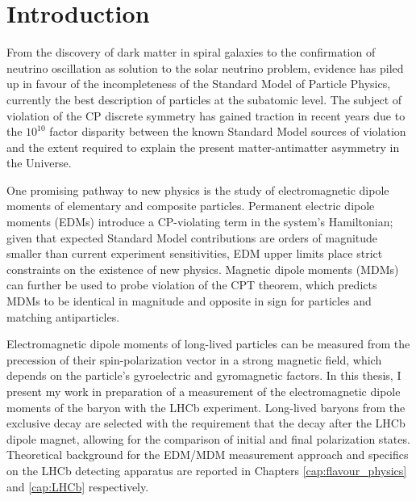 \chapter*{Introduction}

%

From the discovery of dark matter in spiral galaxies to the confirmation of neutrino oscillation as solution to the solar neutrino problem, evidence has piled up in favour of the incompleteness of the Standard Model of Particle Physics, currently the best description of particles at the subatomic level.
The subject of violation of the CP discrete symmetry has gained traction in recent years due to the ${10}^{10}$ factor disparity between the known Standard Model sources of violation and the extent required to explain the present matter-antimatter asymmetry in the Universe. 

One promising pathway to new physics is the study of electromagnetic dipole moments of elementary and composite particles.
Permanent electric dipole moments (EDMs) introduce a CP-violating term in the system's Hamiltonian;
given that expected Standard Model contributions are orders of magnitude smaller than current experiment sensitivities, EDM upper limits place strict constraints on the existence of new physics.
Magnetic dipole moments (MDMs) can further be used to probe violation of the CPT theorem, which predicts MDMs to be identical in magnitude and opposite in sign for particles and matching antiparticles.

Electromagnetic dipole moments of long-lived particles can be measured from the precession of their spin-polarization vector in a strong magnetic field, which depends on the particle's gyroelectric and gyromagnetic factors.
In this thesis, I present my work in preparation of a measurement of the electromagnetic dipole moments of the \lz baryon with the LHCb experiment.
Long-lived \lz baryons from the exclusive \demonstratorfull decay are selected with the requirement that the \lz decay after the LHCb dipole magnet, allowing for the comparison of initial and final polarization states.
Theoretical background for the EDM/MDM measurement approach and specifics on the LHCb detecting apparatus are reported in Chapters \ref{cap:flavour_physics} and \ref{cap:LHCb} respectively.


